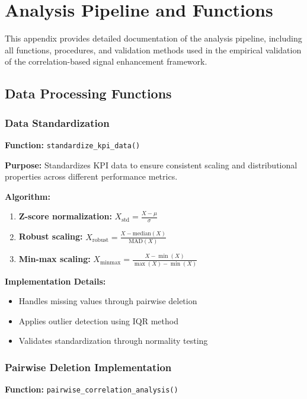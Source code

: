 \section{Analysis Pipeline and Functions}

This appendix provides detailed documentation of the analysis pipeline, including all functions, procedures, and validation methods used in the empirical validation of the correlation-based signal enhancement framework.

\subsection{Data Processing Functions}

\subsubsection{Data Standardization}

\textbf{Function:} \texttt{standardize\_kpi\_data()}

\textbf{Purpose:} Standardizes KPI data to ensure consistent scaling and distributional properties across different performance metrics.

\textbf{Algorithm:}
\begin{enumerate}
    \item \textbf{Z-score normalization:} $X_{\text{std}} = \frac{X - \mu}{\sigma}$
    \item \textbf{Robust scaling:} $X_{\text{robust}} = \frac{X - \text{median}(X)}{\text{MAD}(X)}$
    \item \textbf{Min-max scaling:} $X_{\text{minmax}} = \frac{X - \min(X)}{\max(X) - \min(X)}$
\end{enumerate}

\textbf{Implementation Details:}
\begin{itemize}
    \item Handles missing values through pairwise deletion
    \item Applies outlier detection using IQR method
    \item Validates standardization through normality testing
\end{itemize}

\subsubsection{Pairwise Deletion Implementation}

\textbf{Function:} \texttt{pairwise\_correlation\_analysis()}

